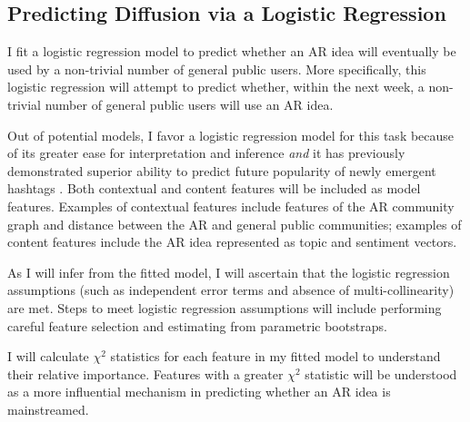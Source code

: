 \documentclass[acmlarge, screen, authorversion]{acmart}
\begin{document}
\subsection{Predicting Diffusion via a Logistic Regression}

I fit a logistic regression model to predict whether an AR idea will eventually be used by a non-trivial number of general public users. More specifically, this logistic regression will attempt to predict whether, within the next week, a non-trivial number of general public users will use an AR idea.

Out of potential models, I favor a logistic regression model for this task because of its greater ease for interpretation and inference \textit{and} it has previously demonstrated superior ability to predict future popularity of newly emergent hashtags \cite{maPredictingPopularityNewly2013}. Both contextual and content features will be included as model features. Examples of contextual features include features of the AR community graph and distance between the AR and general public communities; examples of content features include the AR idea represented as topic and sentiment vectors.

As I will infer from the fitted model, I will ascertain that the logistic regression assumptions (such as independent error terms and absence of multi-collinearity) are met. Steps to meet logistic regression assumptions will include performing careful feature selection and estimating from parametric bootstraps.

I will calculate $\chi^2$ statistics for each feature in my fitted model to understand their relative importance. Features with a greater $\chi^2$ statistic will be understood as a more influential mechanism in predicting whether an AR idea is mainstreamed.
\end{document}
